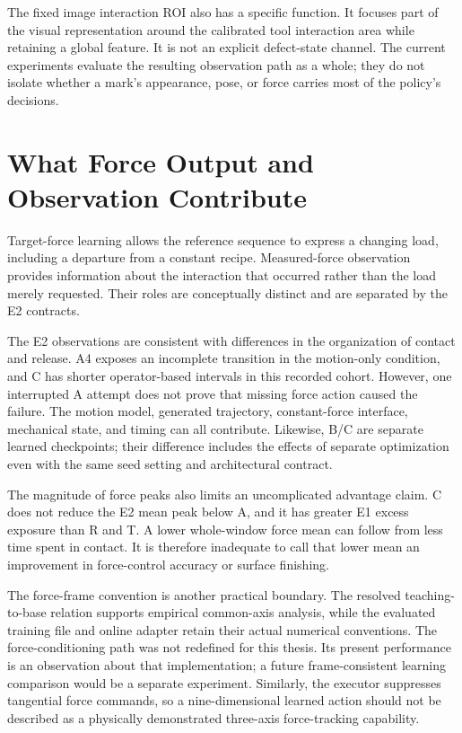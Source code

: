The fixed image interaction ROI also has a specific function. It focuses part of the visual representation around the calibrated tool interaction area while retaining a global feature. It is not an explicit defect-state channel. The current experiments evaluate the resulting observation path as a whole; they do not isolate whether a mark's appearance, pose, or force carries most of the policy's decisions.

\section{What Force Output and Observation Contribute}
Target-force learning allows the reference sequence to express a changing load, including a departure from a constant recipe. Measured-force observation provides information about the interaction that occurred rather than the load merely requested. Their roles are conceptually distinct and are separated by the E2 contracts.

The E2 observations are consistent with differences in the organization of contact and release. A4 exposes an incomplete transition in the motion-only condition, and C has shorter operator-based intervals in this recorded cohort. However, one interrupted A attempt does not prove that missing force action caused the failure. The motion model, generated trajectory, constant-force interface, mechanical state, and timing can all contribute. Likewise, B/C are separate learned checkpoints; their difference includes the effects of separate optimization even with the same seed setting and architectural contract.

The magnitude of force peaks also limits an uncomplicated advantage claim. C does not reduce the E2 mean peak below A, and it has greater E1 excess exposure than R and T. A lower whole-window force mean can follow from less time spent in contact. It is therefore inadequate to call that lower mean an improvement in force-control accuracy or surface finishing.

The force-frame convention is another practical boundary. The resolved teaching-to-base relation supports empirical common-axis analysis, while the evaluated training file and online adapter retain their actual numerical conventions. The force-conditioning path was not redefined for this thesis. Its present performance is an observation about that implementation; a future frame-consistent learning comparison would be a separate experiment. Similarly, the executor suppresses tangential force commands, so a nine-dimensional learned action should not be described as a physically demonstrated three-axis force-tracking capability.

